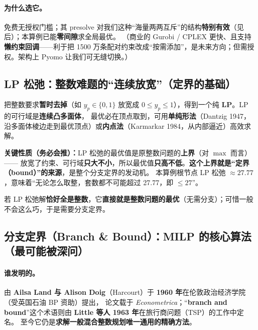 \documentclass[11pt]{ctexart}
\begin{document}
\paragraph{为什么选它。}免费无授权门槛；其 presolve 对我们这种“海量两两互斥”的结构\textbf{特别有效}（见后）；本算例已能\textbf{零间隙}求全局最优。
（商业的 Gurobi / CPLEX 更快、且支持\textbf{懒约束回调}——利于把 1500 万条配对约束改成“按需添加”，是未来方向；但需授权。架构上 Pyomo 让我们可无缝切换。）

\subsection{LP 松弛：整数难题的“连续放宽”（定界的基础）}
把整数要求\textbf{暂时去掉}（如 $y_p\in\{0,1\}$ 放宽成 $0\le y_p\le1$），得到一个纯 \textbf{LP}。LP 的可行域是\textbf{连续凸多面体}，
最优必在顶点取到，可用\textbf{单纯形法}（Dantzig 1947，沿多面体棱边走到最优顶点）或\textbf{内点法}（Karmarkar 1984，从内部逼近）高效求解。
\begin{key}\textbf{关键性质（务必会推）：}LP 松弛的最优值是原整数问题的\textbf{上界}（对 $\max$ 而言）——
放宽了约束、可行域\textbf{只大不小}，所以最优值\textbf{只高不低}。\textbf{这个上界就是“定界（bound）”的来源}，是整个分支定界的发动机。
本算例根节点 LP 松弛 $\approx 27.77$，意味着“无论怎么取整，套数都不可能超过 27.77，即 $\le 27$”。
\end{key}
若 LP 松弛解\textbf{恰好全是整数}，它\textbf{直接就是整数问题的最优}（无需分支）；可惜一般不会这么巧，于是需要分支定界。

\subsection{分支定界（Branch \& Bound）：MILP 的核心算法（最可能被深问）}
\paragraph{谁发明的。}由 \textbf{Ailsa Land 与 Alison Doig}（Harcourt）于 \textbf{1960 年}在伦敦政治经济学院（受英国石油 BP 资助）提出，
论文载于 \emph{Econometrica}；“\textbf{branch and bound}”这个术语则由 \textbf{Little 等人 1963 年}在旅行商问题（TSP）的工作中定名。
至今它仍是\textbf{求解一般混合整数规划唯一通用的精确方法}。
\end{document}
